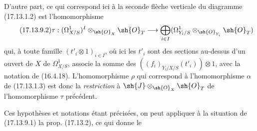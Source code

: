 \begin{env}[17.13.9]
D'autre part, ce qui correspond ici à la seconde flèche verticale du diagramme (17.13.1.2) est l'homomorphisme
\[
\label{IV.17.13.9.2}
\tag{17.13.9.2}
\tau:(\Omega^1_{X/S})^I\otimes_{\sh{O}_X}\sh{O}_T\to\bigoplus_{i\in I}(\Omega^1_{Y_i/S}\otimes_{\sh{O}_{Y_i}}\sh{O}_T)
\]
qui, à toute famille $(t'_i\otimes1)_{i\in I}$, où ici les $t'_i$ sont des sections au-dessus d'un ouvert de $X$ de $\Omega^1_{X/S}$, associe la somme des $((f_i)_{Y_i/X/S}(t'_i))\otimes1$, avec la notation de (16.4.18). L'homomorphisme $\rho$ qui correspond à l'homomorphisme $\alpha$ de (17.13.1.3) est donc la \emph{restriction} à $\sh{J}\otimes_{\sh{O}_X}\sh{O}_T$ de l'homomorphisme $\tau$ précédent.

Ces hypothèses et notations étant précisées, on peut appliquer à la situation de (17.13.9.1) la prop. (17.13.2), ce qui donne le
\end{env}

